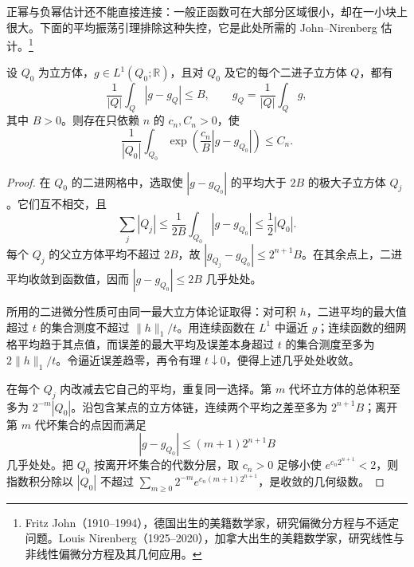 正幂与负幂估计还不能直接连接：一般正函数可在大部分区域很小，却在一小块上很大。下面的平均振荡引理排除这种失控，它是此处所需的 John--Nirenberg 估计。\footnote{Fritz John（1910--1994），德国出生的美籍数学家，研究偏微分方程与不适定问题。Louis Nirenberg（1925--2020），加拿大出生的美籍数学家，研究线性与非线性偏微分方程及其几何应用。}

\begin{lemma}\label{g3:lem:dyadic-exponential-oscillation}
	设 \(Q_0\) 为立方体，\(g\in L^1(Q_0;\mathbb R)\)，且对 \(Q_0\) 及它的每个二进子立方体 \(Q\)，都有
	\[
		\frac1{|Q|}\int_Q|g-g_Q|\le B,
		\qquad g_Q=\frac1{|Q|}\int_Qg,
	\]
	其中 \(B>0\)。则存在只依赖 \(n\) 的 \(c_n,C_n>0\)，使
	\[
		\frac1{|Q_0|}\int_{Q_0}
		\exp\left(\frac{c_n}{B}|g-g_{Q_0}|\right)\le C_n.
	\]
\end{lemma}
\begin{proof}
	在 \(Q_0\) 的二进网格中，选取使 \(|g-g_{Q_0}|\) 的平均大于 \(2B\) 的极大子立方体 \(Q_j\)。它们互不相交，且
	\[
		\sum_j|Q_j|\le\frac1{2B}\int_{Q_0}|g-g_{Q_0}|\le\frac12|Q_0|.
	\]
	每个 \(Q_j\) 的父立方体平均不超过 \(2B\)，故
	\(|g_{Q_j}-g_{Q_0}|\le2^{n+1}B\)。在其余点上，二进平均收敛到函数值，因而 \(|g-g_{Q_0}|\le2B\) 几乎处处。

	所用的二进微分性质可由同一最大立方体论证取得：对可积 \(h\)，二进平均的最大值超过 \(t\) 的集合测度不超过 \(\|h\|_1/t\)。用连续函数在 \(L^1\) 中逼近 \(g\)；连续函数的细网格平均趋于其点值，而误差的最大平均及误差本身超过 \(t\) 的集合测度至多为 \(2\|h\|_1/t\)。令逼近误差趋零，再令有理 \(t\downarrow0\)，便得上述几乎处处收敛。

	在每个 \(Q_j\) 内改减去它自己的平均，重复同一选择。第 \(m\) 代坏立方体的总体积至多为 \(2^{-m}|Q_0|\)。沿包含某点的立方体链，连续两个平均之差至多为 \(2^{n+1}B\)；离开第 \(m\) 代坏集合的点因而满足
	\[
		|g-g_{Q_0}|\le(m+1)2^{n+1}B
	\]
	几乎处处。把 \(Q_0\) 按离开坏集合的代数分层，取 \(c_n>0\) 足够小使 \(e^{c_n2^{n+1}}<2\)，则指数积分除以 \(|Q_0|\) 不超过
	\(\sum_{m\ge0}2^{-m}e^{c_n(m+1)2^{n+1}}\)，是收敛的几何级数。
\end{proof}

